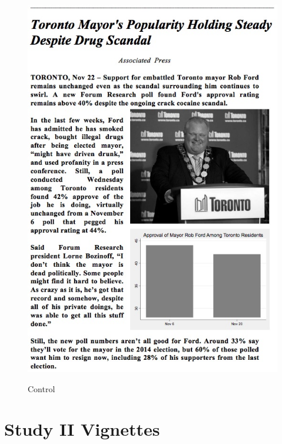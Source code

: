 \documentclass[12pt, letterpaper]{article}
\begin{document}
\begin{figure}[ht]
\centering
\begin{minipage}[b][12cm][b]{0.45\linewidth}
\caption{Control}
\includegraphics[width=1.05\textwidth]{../figs/mturk_1_treats/P.jpg}
\label{fig:minipage5}
\end{minipage}
\end{figure}
\clearpage

\section{Study II Vignettes}
\label{yg_treats}
\end{document}
